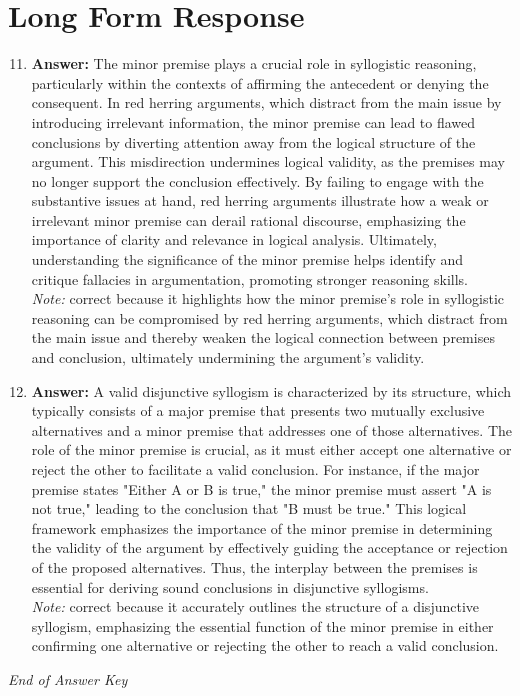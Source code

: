 \documentclass[12pt]{article}
\begin{document}
\section*{Long Form Response}
\begin{enumerate}[label=\arabic*.]
\setcounter{enumi}{10}
\item \textbf{Answer:} The minor premise plays a crucial role in syllogistic reasoning, particularly within the contexts of affirming the antecedent or denying the consequent. In red herring arguments, which distract from the main issue by introducing irrelevant information, the minor premise can lead to flawed conclusions by diverting attention away from the logical structure of the argument. This misdirection undermines logical validity, as the premises may no longer support the conclusion effectively. By failing to engage with the substantive issues at hand, red herring arguments illustrate how a weak or irrelevant minor premise can derail rational discourse, emphasizing the importance of clarity and relevance in logical analysis. Ultimately, understanding the significance of the minor premise helps identify and critique fallacies in argumentation, promoting stronger reasoning skills.
\\ \textit{Note:} correct because it highlights how the minor premise's role in syllogistic reasoning can be compromised by red herring arguments, which distract from the main issue and thereby weaken the logical connection between premises and conclusion, ultimately undermining the argument's validity.
\item \textbf{Answer:} A valid disjunctive syllogism is characterized by its structure, which typically consists of a major premise that presents two mutually exclusive alternatives and a minor premise that addresses one of those alternatives. The role of the minor premise is crucial, as it must either accept one alternative or reject the other to facilitate a valid conclusion. For instance, if the major premise states "Either A or B is true," the minor premise must assert "A is not true," leading to the conclusion that "B must be true." This logical framework emphasizes the importance of the minor premise in determining the validity of the argument by effectively guiding the acceptance or rejection of the proposed alternatives. Thus, the interplay between the premises is essential for deriving sound conclusions in disjunctive syllogisms.
\\ \textit{Note:} correct because it accurately outlines the structure of a disjunctive syllogism, emphasizing the essential function of the minor premise in either confirming one alternative or rejecting the other to reach a valid conclusion.
\end{enumerate}

\vfill
\noindent\textit{End of Answer Key}
\end{document}
